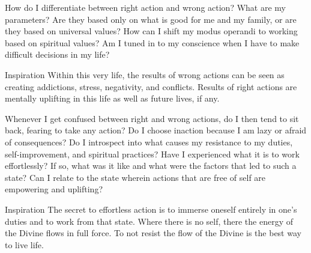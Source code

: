 



\newpage
\begin{mananam}{} 
\mananamtext How do I differentiate between right action and wrong action? What are my parameters? Are they based only on what is good for me and my family, or are they based on universal values? How can I shift my modus operandi to working based on spiritual values? Am I tuned in to my conscience when I have to make difficult decisions in my life?
\end{mananam}
\WritingHand{}
\begin{inspiration}{\mananamfont Inspiration}
\mananamtext Within this very life, the results of wrong actions can be seen as creating addictions, stress, negativity, and conflicts. Results of right actions are mentally uplifting in this life as well as future lives, if any. 
\end{inspiration}
\newpage


\newpage
\begin{mananam}{} 
\mananamtext Whenever I get confused between right and wrong actions, do I then tend to sit back, fearing to take any action? Do I choose inaction because I am lazy or afraid of consequences? Do I introspect into what causes my resistance to my duties, self-improvement, and spiritual practices?
Have I experienced what it is to work effortlessly? If so, what was it like and what were the factors that led to such a state? Can I relate to the state wherein actions that are free of self are empowering and uplifting?
\end{mananam}
\WritingHand{}
\begin{inspiration}{\mananamfont Inspiration}
\mananamtext The secret to effortless action is to immerse oneself entirely in one’s duties and to work from that state. Where there is no self, there the energy of the Divine flows in full force. To not resist the flow of the Divine is the best way to live life.
\end{inspiration}
\newpage

